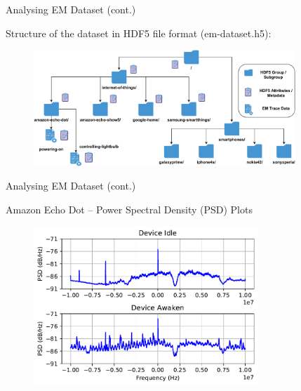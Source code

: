 \documentclass[handout]{beamer}
\begin{document}
\begin{frame}{Analysing EM Dataset (cont.)}  

	\footnotesize
	Structure of the dataset in HDF5 file format (em-dataset.h5):

	\begin{figure}
		\includegraphics[width=280pt]{figures/hdf5-dataset-structure.pdf}
	\end{figure}

\end{frame}

\begin{frame}{Analysing EM Dataset (cont.)}  

	\footnotesize
	Amazon Echo Dot -- Power Spectral Density (PSD) Plots

	\begin{figure}
		\includegraphics[width=240pt]{figures/amazon-echo-dot-psd-plots.pdf}
	\end{figure}

\end{frame}
\end{document}

